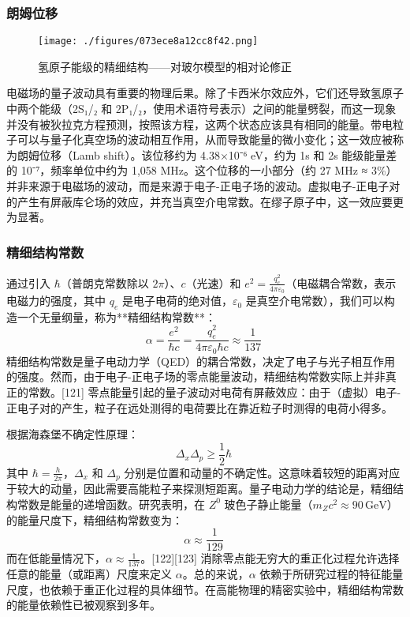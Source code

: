 \subsubsection{朗姆位移}
\begin{figure}[ht]
\centering
\texttt{[image: ./figures/073ece8a12cc8f42.png]}
\caption{氢原子能级的精细结构——对玻尔模型的相对论修正} \label{fig_LD_13}
\end{figure}
电磁场的量子波动具有重要的物理后果。除了卡西米尔效应外，它们还导致氢原子中两个能级（2S₁/₂ 和 2P₁/₂，使用术语符号表示）之间的能量劈裂，而这一现象并没有被狄拉克方程预测，按照该方程，这两个状态应该具有相同的能量。带电粒子可以与量子化真空场的波动相互作用，从而导致能量的微小变化；这一效应被称为朗姆位移（Lamb shift）。该位移约为 4.38×10⁻⁶ eV，约为 1s 和 2s 能级能量差的 10⁻⁷，频率单位中约为 1,058 MHz。这个位移的一小部分（约 27 MHz ≈ 3\%）并非来源于电磁场的波动，而是来源于电子-正电子场的波动。虚拟电子-正电子对的产生有屏蔽库仑场的效应，并充当真空介电常数。在缪子原子中，这一效应要更为显著。
\subsubsection{精细结构常数}
通过引入 \( \hbar \)（普朗克常数除以 \( 2\pi \)）、\( c \)（光速）和 \( e^2 = \frac{q_e^2}{4\pi\varepsilon_0} \)（电磁耦合常数，表示电磁力的强度，其中 \( q_e \) 是电子电荷的绝对值，\( \varepsilon_0 \) 是真空介电常数），我们可以构造一个无量纲量，称为**精细结构常数**：
\[
\alpha = \frac{e^2}{\hbar c} = \frac{q_e^2}{4\pi\varepsilon_0\hbar c} \approx \frac{1}{137}~
\]
精细结构常数是量子电动力学（QED）的耦合常数，决定了电子与光子相互作用的强度。然而，由于电子-正电子场的零点能量波动，精细结构常数实际上并非真正的常数。[121] 零点能量引起的量子波动对电荷有屏蔽效应：由于（虚拟）电子-正电子对的产生，粒子在远处测得的电荷要比在靠近粒子时测得的电荷小得多。

根据海森堡不确定性原理：
\[
\Delta_x \Delta_p \geq \frac{1}{2}\hbar~
\]
其中 \( \hbar = \frac{h}{2\pi} \)，\( \Delta_x \) 和 \( \Delta_p \) 分别是位置和动量的不确定性。这意味着较短的距离对应于较大的动量，因此需要高能粒子来探测短距离。量子电动力学的结论是，精细结构常数是能量的递增函数。研究表明，在 \( Z^0 \) 玻色子静止能量（\( m_Zc^2 \approx 90 \, \text{GeV} \)）的能量尺度下，精细结构常数变为：
\[
\alpha \approx \frac{1}{129}~
\]
而在低能量情况下，\( \alpha \approx \frac{1}{137} \)。[122][123] 消除零点能无穷大的重正化过程允许选择任意的能量（或距离）尺度来定义 \( \alpha \)。总的来说，\( \alpha \) 依赖于所研究过程的特征能量尺度，也依赖于重正化过程的具体细节。在高能物理的精密实验中，精细结构常数的能量依赖性已被观察到多年。
